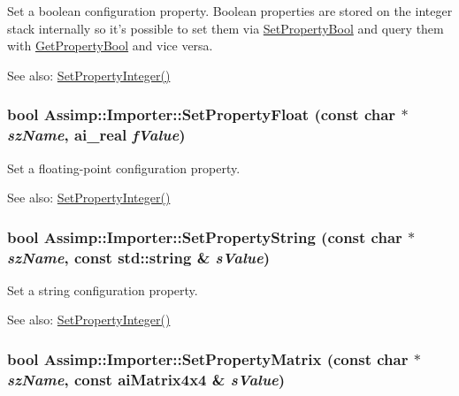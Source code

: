 Set a boolean configuration property. Boolean properties are stored on the integer stack internally so it's possible to set them via \hyperlink{class_assimp_1_1_importer_4af22a88eddf464d949a761149c72825}{SetPropertyBool} and query them with \hyperlink{class_assimp_1_1_importer_90f5d35d25e5d2a0ef8bc0c6545b2010}{GetPropertyBool} and vice versa. \begin{Desc}
\item[See also:]\hyperlink{class_assimp_1_1_importer_2542eed3d5f491025c4095b4e55fa068}{SetPropertyInteger()} \end{Desc}
\hypertarget{class_assimp_1_1_importer_d38af78d6fe4b1f132d2534d8a84deea}{
\subsubsection[SetPropertyFloat]{\setlength{\rightskip}{0pt plus 5cm}bool Assimp::Importer::SetPropertyFloat (const char $\ast$ {\em szName}, \/  ai\_\-real {\em fValue})}}
\label{class_assimp_1_1_importer_d38af78d6fe4b1f132d2534d8a84deea}


Set a floating-point configuration property. \begin{Desc}
\item[See also:]\hyperlink{class_assimp_1_1_importer_2542eed3d5f491025c4095b4e55fa068}{SetPropertyInteger()} \end{Desc}
\hypertarget{class_assimp_1_1_importer_854087b213981108e3e464cf4d293fed}{
\subsubsection[SetPropertyString]{\setlength{\rightskip}{0pt plus 5cm}bool Assimp::Importer::SetPropertyString (const char $\ast$ {\em szName}, \/  const std::string \& {\em sValue})}}
\label{class_assimp_1_1_importer_854087b213981108e3e464cf4d293fed}


Set a string configuration property. \begin{Desc}
\item[See also:]\hyperlink{class_assimp_1_1_importer_2542eed3d5f491025c4095b4e55fa068}{SetPropertyInteger()} \end{Desc}
\hypertarget{class_assimp_1_1_importer_cd128e5fb5777ef238b8bd1454a9c3ad}{
\subsubsection[SetPropertyMatrix]{\setlength{\rightskip}{0pt plus 5cm}bool Assimp::Importer::SetPropertyMatrix (const char $\ast$ {\em szName}, \/  const aiMatrix4x4 \& {\em sValue})}}
\label{class_assimp_1_1_importer_cd128e5fb5777ef238b8bd1454a9c3ad}


